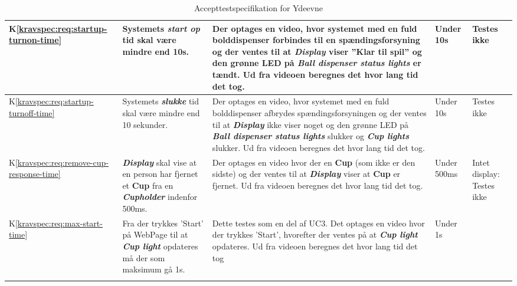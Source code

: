\documentclass[Accepttestspecifikation/Accepttest_Main.tex]{subfiles}
\begin{document}
\begin{longtable}{|L{0.08\textwidth}|L{0.3\textwidth}|L{0.3\textwidth}|L{0.2\textwidth}|L{0.2\textwidth}|}
K\ref{kravspec:req:startup-turnon-time} & Systemets \textbf{\textit{start op}} tid skal være mindre end 10s. & Der optages en video, hvor systemet med en fuld bolddispenser forbindes til en spændingsforsyning og der ventes til at \textbf{\textit{Display}} viser ''Klar til spil'' og den grønne LED på \textbf{\textit{Ball dispenser status lights}} er tændt. Ud fra videoen beregnes det hvor lang tid det tog. & Under 10s & Testes ikke \\ \hline
K\ref{kravspec:req:startup-turnoff-time} & Systemets \textbf{\textit{slukke}} tid skal være mindre end 10 sekunder. & Der optages en video, hvor systemet med en fuld bolddispenser afbrydes spændingsforsyningen og der ventes til at \textbf{\textit{Display}} ikke viser noget og den grønne LED på \textbf{\textit{Ball dispenser status lights}} slukker og \textbf{\textit{Cup lights}} slukker. Ud fra videoen beregnes det hvor lang tid det tog. & Under 10s  & Testes ikke  \\ \hline
K\ref{kravspec:req:remove-cup-response-time} & \textit{\textbf{Display}} skal vise at en person har fjernet et \textbf{Cup} fra en \textit{\textbf{Cupholder}} indenfor 500ms. & Der optages en video hvor der en \textbf{Cup} (som ikke er den sidste) og der ventes til at \textbf{\textit{Display}} viser at \textbf{Cup} er fjernet. Ud fra videoen beregnes det hvor lang tid det tog. & Under 500ms&  Intet display: Testes ikke \\ \hline
K\ref{kravspec:req:max-start-time} & Fra der trykkes 'Start' på WebPage til at \textbf{\textit{Cup light}} opdateres må der som maksimum gå 1s. & Dette testes som en del af UC3. Det optages en video hvor der trykkes 'Start', hvorefter der ventes på at \textbf{\textit{Cup light}} opdateres. Ud fra videoen beregnes det hvor lang tid det tog & Under 1s & \\ \hline
\caption{Accepttestspecifikation for Ydeevne}
\label{tab:IkkeFunktYdeevne}
\end{longtable}
\end{document}
